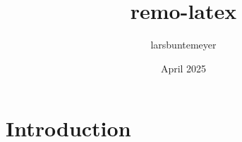 \documentclass{article}
\title{remo-latex}
\author{larsbuntemeyer }
\date{April 2025}
\begin{document}
\maketitle

\section{Introduction}
\end{document}
